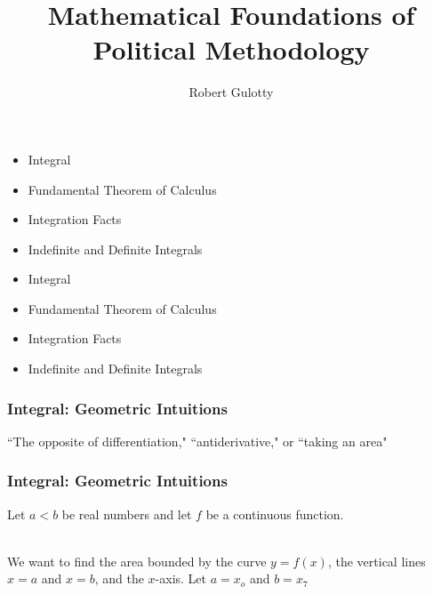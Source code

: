 \documentclass{beamer}
\title[PLSC 43401] %
{Mathematical Foundations of Political Methodology}
\author{Robert Gulotty}
\institute[University of Chicago]{Department of Political Science \\  University of Chicago}
\numberwithin{equation}{section}
\begin{document}
\begin{frame}
\titlepage
\end{frame}



\begin{frame}

\begin{itemize}
\item \textcolor{myblack}{Integral}
\item \textcolor{myblack}{Fundamental Theorem of Calculus}
\item \textcolor{myblack}{Integration Facts}
\item \textcolor{myblack}{Indefinite and Definite Integrals}
\end{itemize}

\end{frame}



\begin{frame}

\begin{itemize}
\item \textcolor{myblack}{Integral}
\item \textcolor{mygray}{Fundamental Theorem of Calculus}
\item \textcolor{mygray}{Integration Facts}
\item \textcolor{mygray}{Indefinite and Definite Integrals}
\end{itemize}

\end{frame}



\begin{frame}
\frametitle{Integral: Geometric Intuitions}

``The opposite of differentiation," ``antiderivative," or ``taking an area"
 
\vspace{.2in}
\begin{center}
\end{center}
 
\end{frame}



\begin{frame}
\frametitle{Integral: Geometric Intuitions}

Let $a<b$ be real numbers and let $f$ be a continuous function. \pause
 
\ \\We want to find the area bounded by the curve $y=f(x)$, the vertical lines $x=a$ and $x=b$, and the $x$-axis.  Let $a=x_o$ and $b=x_7$

\begin{center}
\end{center}

\end{frame}
\end{document}
